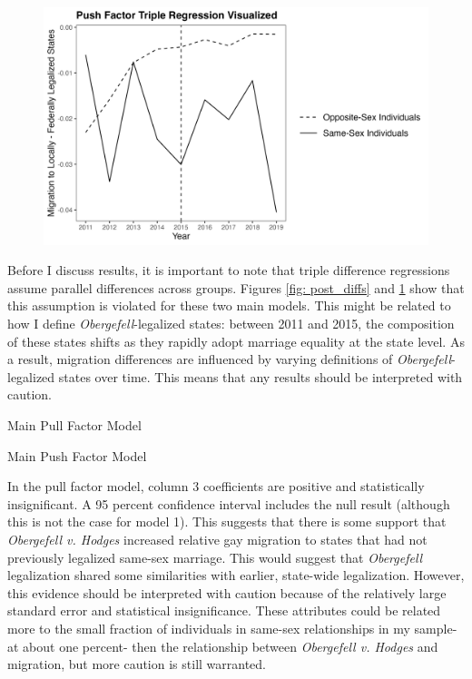 \documentclass[12pt,letterpaper]{article}
\begin{document}
\begin{figure}[htbp]
    \centering
    \includegraphics[width=0.75\linewidth]{outputs/summary_stats/ante_diffs.png}
    \caption{}
    \label{fig: ante_diffs}
\end{figure}

Before I discuss results, it is important to note that triple difference regressions assume parallel differences across groups. Figures \ref{fig: post_diffs} and \ref{fig: ante_diffs} show that this assumption is violated for these two main models. This might be related to how I define \textit{Obergefell}-legalized states: between 2011 and 2015, the composition of these states shifts as they rapidly adopt marriage equality at the state level. As a result, migration differences are influenced by varying definitions of \textit{Obergefell}-legalized states over time. This means that any results should be interpreted with caution.

\begin{table}[htbp]
    \centering
    \caption{Main Pull Factor Model}
    \label{tab: expost_model}
    
\end{table}
\begin{table}[htbp]
    \centering
    \caption{Main Push Factor Model}
    \label{tab: exante_model}
    
\end{table}

In the pull factor model, column 3 coefficients are positive and statistically insignificant. A 95 percent confidence interval includes the null result (although this is not the case for model 1). This suggests that there is some support that \textit{Obergefell v. Hodges} increased relative gay migration to states that had not previously legalized same-sex marriage. This would suggest that \textit{Obergefell} legalization shared some similarities with earlier, state-wide legalization. However, this evidence should be interpreted with caution because of the relatively large standard error and statistical insignificance. These attributes could be related more to the small fraction of individuals in same-sex relationships in my sample- at about one percent- then the relationship between \textit{Obergefell v. Hodges} and migration, but more caution is still warranted.
\end{document}
